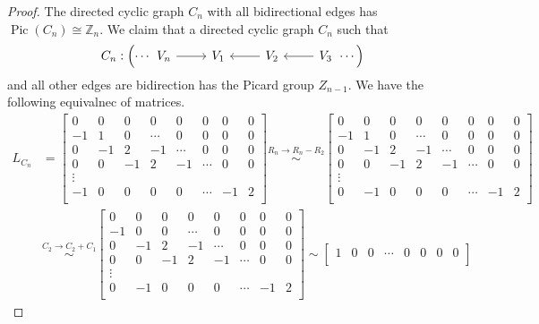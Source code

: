 \documentclass[11pt,reqno]{amsart}
\DeclareMathOperator{\Pic}{Pic}
\newcommand{\Z}{\mathbb{Z}}
\theoremstyle{definition}
\theoremstyle{plain}
\begin{document}
		\begin{proof}
			The directed cyclic graph $C_n$ with all bidirectional edges has $\Pic (C_n) \cong \Z_n$. 
			We claim that a directed cyclic graph $C_n$ such that 
			\[
			C_n: \left( \cdots \begin{tikzcd}
				V_n \arrow[r] & V_1 & V_2 \arrow[l] & V_3 \arrow[l]
			\end{tikzcd} \cdots \right)
			\]
			and all other edges are bidirection has the Picard group $Z_{n-1}$. 
			We have the following equivalnec of matrices.
			\begin{align}
			L_{C_n} &= \begin{bmatrix}
				0 & 0 & 0 & 0 & 0 & 0 & 0 & 0   \\
				-1 & 1 & 0 & \cdots & 0 & 0 & 0 & 0  \\
				0 & -1 & 2 & -1 & \cdots & 0 & 0 & 0 \\
				0 & 0 & -1 & 2 & -1 & \cdots & 0 & 0  \\
				\vdots \\
				-1 & 0 & 0 & 0 & 0 & \cdots & -1 & 2 \\
			\end{bmatrix}
			\stackrel{R_{n} \to R_{n} - R_{2}}\sim 
			\begin{bmatrix}
				0 & 0 & 0 & 0 & 0 & 0 & 0 & 0   \\
				-1 & 1 & 0 & \cdots & 0 & 0 & 0 & 0  \\
				0 & -1 & 2 & -1 & \cdots & 0 & 0 & 0 \\
				0 & 0 & -1 & 2 & -1 & \cdots & 0 & 0  \\
				\vdots \\
				0 & -1 & 0 & 0 & 0 & \cdots & -1 & 2 \\
			\end{bmatrix}\\
			&\stackrel{C_2 \to C_2+C_1}\sim 
			\begin{bmatrix}
				0 & 0 & 0 & 0 & 0 & 0 & 0 & 0   \\
				-1 & 0 & 0 & \cdots & 0 & 0 & 0 & 0 \\
				0 & -1 & 2 & -1 & \cdots & 0 & 0 & 0 \\
				0 & 0 & -1 & 2 & -1 & \cdots & 0 & 0  \\
				\vdots \\
				0 & -1 & 0 & 0 & 0 & \cdots & -1 & 2 \\
			\end{bmatrix}
			\sim 
			\begin{bmatrix}
				1 & 0 & 0 & \cdots & 0 & 0 & 0 & 0 \\

\end{bmatrix}
\end{align}
\end{proof}
\end{document}

